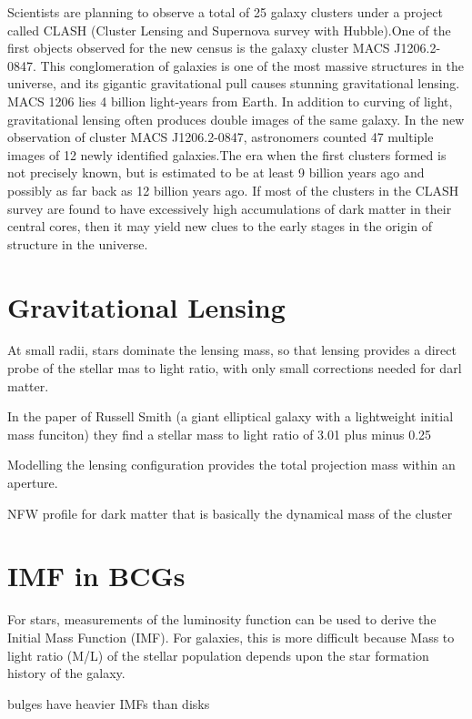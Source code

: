 Scientists are planning to observe a total of 25 galaxy clusters under a project called CLASH (Cluster Lensing and Supernova survey with Hubble).One of the first objects observed for the new census is the galaxy cluster MACS J1206.2-0847. This conglomeration of galaxies is one of the most massive structures in the universe, and its gigantic gravitational pull causes stunning gravitational lensing. MACS 1206 lies 4 billion light-years from Earth. In addition to curving of light, gravitational lensing often produces double images of the same galaxy. In the new observation of cluster MACS J1206.2-0847, astronomers counted 47 multiple images of 12 newly identified galaxies.The era when the first clusters formed is not precisely known, but is estimated to be at least 9 billion years ago and possibly as far back as 12 billion years ago. If most of the clusters in the CLASH survey are found to have excessively high accumulations of dark matter in their central cores, then it may yield new clues to the early stages in the origin of structure in the universe.


\section{Gravitational Lensing}

At small radii, stars dominate the lensing mass, so that lensing provides a direct probe of the stellar mas to light ratio, with only small corrections needed for darl matter.

In the paper of Russell Smith (a giant elliptical galaxy with a lightweight initial mass funciton) they find a stellar mass to light ratio of 3.01 plus minus 0.25

Modelling the lensing configuration provides the total projection mass within an aperture.

NFW profile for dark matter that is basically the dynamical mass of the cluster

\section{IMF in BCGs}

For stars, measurements of the luminosity function can be
used to derive the Initial Mass Function (IMF).
For galaxies, this is more difficult because Mass to light ratio (M/L) of the stellar population
depends upon the star formation history of
the galaxy.

bulges have heavier IMFs than disks


